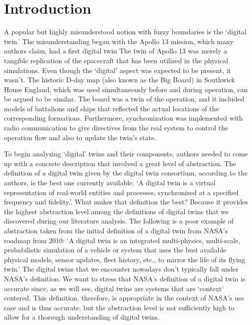 \documentclass[9pt,conference]{IEEEtran}
\begin{document}
    \section{Introduction}\label{section:introduction}
    A popular but highly misunderstood notion with fuzzy boundaries is the `digital twin.' 
    The misunderstanding began with the Apollo 13 mission, which many authors claim, had a first digital twin The twin of Apollo 13 was merely a tangible replication of the spacecraft that has been utilized in the physical simulations. Even though the `digital' aspect was expected to be present, 
    it wasn't.  The historic D-day map (also known as the Big Board) in Southwick House England, which was used simultaneously before and during operation, can be argued to be similar. 
    The board was a twin of the operation, and it included models of battalions and ships that reflected the actual locations of the corresponding formations. 
    Furthermore, synchronization was implemented with radio communication to give directives from the real system to control the operation flow and also to update the twin's state.

    To begin analyzing `digital' twins and their components, authors needed to come up with a concrete description that involved a great level of abstraction. 
    The definition of a digital twin given by the digital twin consortium, according to the authors, is the best one currently available: `A digital twin is a virtual representation of real-world entities and processes, synchronized at a specified frequency and fidelity.'.  
    What makes that definition the best? Because it provides the highest abstraction level among the definitions of digital twins that we discovered during our literature analysis. The following is a poor example of abstraction taken from the initial definition of a digital twin from NASA's roadmap from 2010: `A digital twin is an integrated multi-physics, multi-scale, probabilistic simulation of a 
    vehicle or system that uses the best available physical models, sensor updates, fleet history, etc., to mirror the life of its flying twin.'
    The digital twins that we encounter nowadays don't typically fall under NASA's definition. We want to stress that NASA's definition of a  digital twin is accurate since, as we will see, digital twins are systems that are `context' centered. 
    This definition, therefore, is appropriate in the context of NASA's use case and is thus accurate, but the abstraction level is not sufficiently high to allow for a thorough understanding of digital twins.
\end{document}
